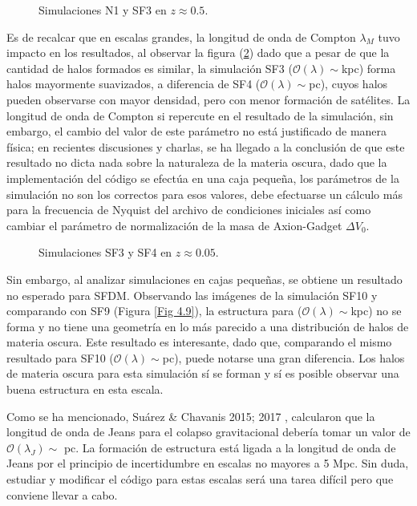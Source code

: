 \documentclass[a4paper,openright,12pt]{book}
\begin{document}
\begin{figure}
\centering
{}
\caption{\footnotesize{Simulaciones N1 y SF3 en $z\approx0.5$.}}\label{Fig 4.7}
\end{figure}
Es de recalcar que en escalas grandes, la longitud de onda de Compton $\lambda_{M}$ tuvo impacto en los resultados, al observar la figura (\ref{Fig 4.8}) dado que a pesar de que la cantidad de halos formados es similar, la simulación SF3 ($\mathcal{O}(\lambda)\sim$kpc) forma halos mayormente suavizados, a diferencia de SF4 ($\mathcal{O}(\lambda)\sim$pc), cuyos halos pueden observarse con mayor densidad, pero con menor formación de satélites. La longitud de onda de Compton si repercute en el resultado de la simulación, sin embargo, el cambio del valor de este parámetro no está justificado de manera física; en recientes discusiones y charlas, se ha llegado a la conclusión de que este resultado no dicta nada sobre la naturaleza de la materia oscura, dado que la implementación del código se efectúa en una caja pequeña, los parámetros de la simulación no son los correctos para esos valores, debe efectuarse un cálculo más para la frecuencia de Nyquist del archivo de condiciones iniciales así como cambiar el parámetro de normalización de la masa de Axion-Gadget $\Delta V_{0}$.

\begin{figure}
\centering
{}
\caption{\footnotesize{Simulaciones SF3 y SF4 en $z\approx0.05$. }}\label{Fig 4.8}
\end{figure}
Sin embargo, al analizar simulaciones en cajas pequeñas, se obtiene un resultado no esperado para SFDM. Observando las imágenes de la simulación SF10 y comparando con SF9 (Figura \ref{Fig 4.9}), la estructura para ($\mathcal{O}(\lambda)\sim$kpc) no se forma y no tiene una geometría en lo más parecido a una distribución de halos de materia oscura. Este resultado es interesante, dado que, comparando el mismo resultado para SF10 ($\mathcal{O}(\lambda)\sim$pc), puede notarse una gran diferencia. Los halos de materia oscura para esta simulación sí se forman y sí es posible observar una buena estructura en esta escala.

Como se ha mencionado, Suárez \& Chavanis 2015; 2017 \cite{4.3.6, 4.3.7}, calcularon que la longitud de onda de Jeans para el colapso gravitacional debería tomar un valor de $\mathcal{O}(\lambda_{J})\sim$ pc. La formación de estructura está ligada a la longitud de onda de Jeans por el principio de incertidumbre en escalas no mayores a 5 Mpc. Sin duda, estudiar y modificar el código para estas escalas será una tarea difícil pero que conviene llevar a cabo.
\end{document}
